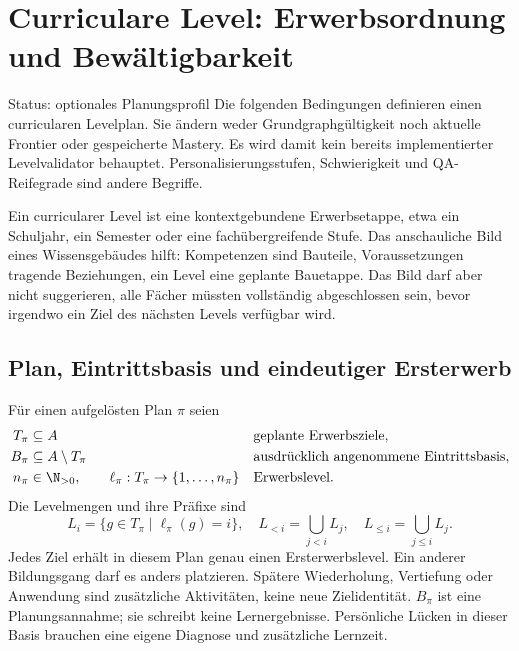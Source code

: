 \section{Curriculare Level: Erwerbsordnung und Bewältigbarkeit}
\label{sec:levels}
\begin{principle}{Status: optionales Planungsprofil}
Die folgenden Bedingungen definieren einen curricularen Levelplan.
Sie ändern weder Grundgraphgültigkeit noch aktuelle Frontier oder
gespeicherte Mastery. Es wird damit kein bereits implementierter
Levelvalidator behauptet. Personalisierungsstufen, Schwierigkeit und
QA-Reifegrade sind andere Begriffe.
\end{principle}

Ein curricularer Level ist eine kontextgebundene Erwerbsetappe, etwa ein
Schuljahr, ein Semester oder eine fachübergreifende Stufe. Das anschauliche
Bild eines Wissensgebäudes hilft: Kompetenzen sind Bauteile, Voraussetzungen
tragende Beziehungen, ein Level eine geplante Bauetappe. Das Bild darf aber
nicht suggerieren, alle Fächer müssten vollständig abgeschlossen sein,
bevor irgendwo ein Ziel des nächsten Levels verfügbar wird.

\subsection{Plan, Eintrittsbasis und eindeutiger Ersterwerb}
Für einen aufgelösten Plan $\pi$ seien
\begin{align}
 T_\pi&\subseteq A &&\text{geplante Erwerbsziele},\\
 B_\pi&\subseteq A\setminus T_\pi &&\text{ausdrücklich angenommene Eintrittsbasis},\\
 n_\pi&\in\N_{>0},\qquad
 \ell_\pi:T_\pi\to\{1,\ldots,n_\pi\} &&\text{Erwerbslevel}.
\end{align}
Die Levelmengen und ihre Präfixe sind
\[
 L_i=\{g\in T_\pi\mid\ell_\pi(g)=i\},\quad
 L_{<i}=\bigcup_{j<i}L_j,\quad L_{\leq i}=\bigcup_{j\leq i}L_j.
\]
Jedes Ziel erhält in diesem Plan genau einen Ersterwerbslevel. Ein anderer
Bildungsgang darf es anders platzieren. Spätere Wiederholung, Vertiefung oder
Anwendung sind zusätzliche Aktivitäten, keine neue Zielidentität.
$B_\pi$ ist eine Planungsannahme; sie schreibt keine Lernergebnisse.
Persönliche Lücken in dieser Basis brauchen eine eigene Diagnose und
zusätzliche Lernzeit.

